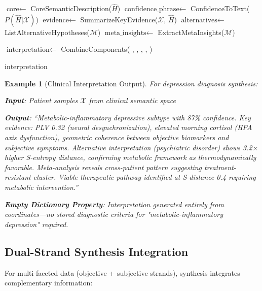 \documentclass[12pt,a4paper]{article}
\newtheorem{example}{Example}
\begin{document}
\begin{algorithm}[H]
\caption{Natural Language Interpretation Generation}
\begin{algorithmic}[1]
\State $\text{core} \leftarrow$ CoreSemanticDescription($\hat{H}$) 
\State $\text{confidence\_phrase} \leftarrow$ ConfidenceToText($P(\hat{H} | \mathcal{X})$)
\State $\text{evidence} \leftarrow$ SummarizeKeyEvidence($\mathcal{X}$, $\hat{H}$)
\State $\text{alternatives} \leftarrow$ ListAlternativeHypotheses($\mathcal{M}$)
\State $\text{meta\_insights} \leftarrow$ ExtractMetaInsights($\mathcal{M}$)

\State $\text{interpretation} \leftarrow$ CombineComponents(
\State \quad {}, , ,
\State \quad {}, 
\State )

\State \Return $\text{interpretation}$
\EndProcedure
\end{algorithmic}
\end{algorithm}

\begin{example}[Clinical Interpretation Output]
For depression diagnosis synthesis:

\textbf{Input}: Patient samples $\mathcal{X}$ from clinical semantic space

\textbf{Output}: ``Metabolic-inflammatory depressive subtype with 87\% confidence. Key evidence: PLV 0.32 (neural desynchronization), elevated morning cortisol (HPA axis dysfunction), geometric coherence between objective biomarkers and subjective symptoms. Alternative interpretation (psychiatric disorder) shows 3.2× higher S-entropy distance, confirming metabolic framework as thermodynamically favorable. Meta-analysis reveals cross-patient pattern suggesting treatment-resistant cluster. Viable therapeutic pathway identified at S-distance 0.4 requiring metabolic intervention.''

\textbf{Empty Dictionary Property}: Interpretation generated entirely from coordinates—no stored diagnostic criteria for "metabolic-inflammatory depression" required.
\end{example}

\subsection{Dual-Strand Synthesis Integration}

For multi-faceted data (objective + subjective strands), synthesis integrates complementary information:
\end{document}
